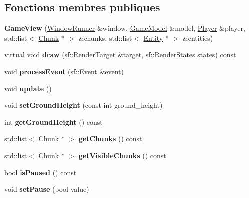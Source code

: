 \subsection*{Fonctions membres publiques}
\begin{DoxyCompactItemize}
\item 
\hypertarget{class_game_view_ab420473d6e9d5cade080d1277afec79a}{{\bfseries Game\+View} (\hyperlink{class_window_runner}{Window\+Runner} \&window, \hyperlink{class_game_model}{Game\+Model} \&model, \hyperlink{class_player}{Player} \&player, std\+::list$<$ \hyperlink{class_chunk}{Chunk} $\ast$ $>$ \&chunks, std\+::list$<$ \hyperlink{class_entity}{Entity} $\ast$ $>$ \&entities)}\label{class_game_view_ab420473d6e9d5cade080d1277afec79a}

\item 
\hypertarget{class_game_view_aa95c36b8979a37f1934bf557bc834dfa}{virtual void {\bfseries draw} (sf\+::\+Render\+Target \&target, sf\+::\+Render\+States states) const }\label{class_game_view_aa95c36b8979a37f1934bf557bc834dfa}

\item 
\hypertarget{class_game_view_a3a4e14f0c5abfbe0272992042b74838b}{void {\bfseries process\+Event} (sf\+::\+Event \&event)}\label{class_game_view_a3a4e14f0c5abfbe0272992042b74838b}

\item 
\hypertarget{class_game_view_a799773c01e7e0833c6698eeceb01b6a1}{void {\bfseries update} ()}\label{class_game_view_a799773c01e7e0833c6698eeceb01b6a1}

\item 
\hypertarget{class_game_view_af9b319379a1096abe4ac2be9972cc947}{void {\bfseries set\+Ground\+Height} (const int ground\+\_\+height)}\label{class_game_view_af9b319379a1096abe4ac2be9972cc947}

\item 
\hypertarget{class_game_view_a01e95b8f6867859cd1632d5f3b008168}{int {\bfseries get\+Ground\+Height} () const }\label{class_game_view_a01e95b8f6867859cd1632d5f3b008168}

\item 
\hypertarget{class_game_view_a415c57734a2ff16fb1070677d7505a96}{std\+::list$<$ \hyperlink{class_chunk}{Chunk} $\ast$ $>$ {\bfseries get\+Chunks} () const }\label{class_game_view_a415c57734a2ff16fb1070677d7505a96}

\item 
\hypertarget{class_game_view_a59946ea7d1e828d32253d9a2daf0d00d}{std\+::list$<$ \hyperlink{class_chunk}{Chunk} $\ast$ $>$ {\bfseries get\+Visible\+Chunks} () const }\label{class_game_view_a59946ea7d1e828d32253d9a2daf0d00d}

\item 
\hypertarget{class_game_view_a40ddf9199f7b1185015a09bccdaa5983}{bool {\bfseries is\+Paused} () const }\label{class_game_view_a40ddf9199f7b1185015a09bccdaa5983}

\item 
\hypertarget{class_game_view_a2e8cf051b09e8f2407a1c8f5c07eef4a}{void {\bfseries set\+Pause} (bool value)}\label{class_game_view_a2e8cf051b09e8f2407a1c8f5c07eef4a}

\end{DoxyCompactItemize}


